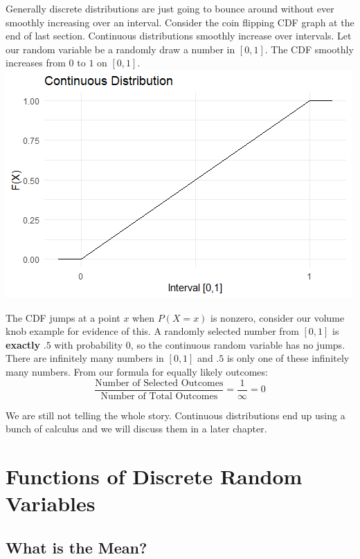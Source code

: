 \documentclass[
]{book}
\theoremstyle{definition}
\theoremstyle{definition}
\theoremstyle{definition}
\theoremstyle{remark}
\begin{document}
Generally discrete distributions are just going to bounce around without ever smoothly increasing over an interval. Consider the coin flipping CDF graph at the end of last section. Continuous distributions smoothly increase over intervals. Let our random variable be a randomly draw a number in \([0,1]\). The CDF smoothly increases from \(0\) to \(1\) on \([0,1]\).
\includegraphics{Pictures/04-RV/continuousplot.PNG}

The CDF jumps at a point \(x\) when \(P(X=x)\) is nonzero, consider our volume knob example for evidence of this. A randomly selected number from \([0,1]\) is \textbf{exactly} \(.5\) with probability \(0\), so the continuous random variable has no jumps. There are infinitely many numbers in \([0,1]\) and \(.5\) is only one of these infinitely many numbers. From our formula for equally likely outcomes:
\[\frac{\text{Number of Selected Outcomes}}{\text{Number of Total Outcomes}}=\frac{1}{\infty}=0\]

We are still not telling the whole story. Continuous distributions end up using a bunch of calculus and we will discuss them in a later chapter.

\hypertarget{functions-of-discrete-random-variables}{%
\chapter{Functions of Discrete Random Variables}\label{functions-of-discrete-random-variables}}

\hypertarget{what-is-the-mean}{%
\section{What is the Mean?}\label{what-is-the-mean}}
\end{document}
